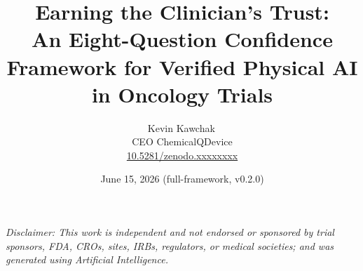 \documentclass[11pt]{article}
\title{Earning the Clinician's Trust:\\ An Eight-Question Confidence Framework for Verified Physical AI in Oncology Trials}
\author{Kevin Kawchak\,\orcidicon{0009-0007-5457-8667}\\ CEO ChemicalQDevice\\ \href{https://doi.org/10.5281/zenodo.xxxxxxxx}{10.5281/zenodo.xxxxxxxx}}
\date{June 15, 2026 \quad (full-framework, v0.2.0)}
\begin{document}
\maketitle
\thispagestyle{empty}

\begin{abstract}

\end{abstract}

\vspace{0.2em}\noindent\footnotesize\textit{Disclaimer: This work is independent
and not endorsed or sponsored by trial sponsors, FDA, CROs, sites, IRBs,
regulators, or medical societies; and was generated using Artificial
Intelligence.}\normalsize\par




\tableofcontents
\vspace{0.3cm}










\clearpage


\clearpage
{}
\begingroup\raggedright\nocite{*}\endgroup


\end{document}
